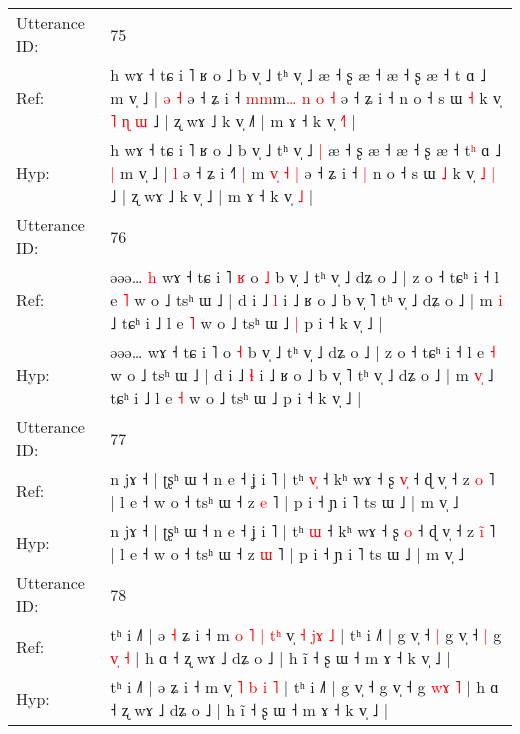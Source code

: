 \documentclass[10pt]{article}
\DeclareRobustCommand{\hl}[1]{{\textcolor{red}{#1}}}
\begin{document}
\begin{longtable}{ll}
 \\
\midrule
Utterance ID: & 75 \\
Ref: & h wɤ ˧ tɕ i ˥ ʁ o ˩ b v̩ ˩ tʰ v̩ ˩\hl{}\hl{} æ ˧ ʂ æ ˧ æ ˧ ʂ æ ˧ t\hl{} ɑ ˩\hl{}\hl{} m v̩ ˩ |\hl{ }\hl{ə} \hl{˧} ə ˧ ʑ i ˧\hl{} \hl{m}\hl{m}m\hl{…}\hl{ }\hl{n} \hl{o} \hl{˧} ə ˧ ʑ i ˧\hl{}\hl{} n o ˧ s ɯ \hl{˧} k v̩\hl{ }\hl{˥} \hl{ɳ} \hl{ɯ} ˩ | ʐ wɤ ˩ k v̩ ˩\hl{˥} | m ɤ ˧ k v̩ \hl{˧}\hl{˥} |
 \\
Hyp: & h wɤ ˧ tɕ i ˥ ʁ o ˩ b v̩ ˩ tʰ v̩ ˩\hl{ }\hl{|} æ ˧ ʂ æ ˧ æ ˧ ʂ æ ˧ t\hl{ʰ} ɑ ˩\hl{ }\hl{|} m v̩ ˩ |\hl{}\hl{} \hl{l} ə ˧ ʑ i ˧\hl{˥} \hl{|}\hl{ }m\hl{ }\hl{v}\hl{̩} \hl{˧} \hl{|} ə ˧ ʑ i ˧\hl{ }\hl{|} n o ˧ s ɯ \hl{˩} k v̩\hl{}\hl{} \hl{˩} \hl{|} ˩ | ʐ wɤ ˩ k v̩ ˩\hl{} | m ɤ ˧ k v̩ \hl{}\hl{˩} |
 \\
\midrule
Utterance ID: & 76 \\
Ref: & əəə…\hl{ }\hl{h} wɤ ˧ tɕ i ˥\hl{ }\hl{ʁ} o \hl{˩} b v̩ ˩ tʰ v̩ ˩ dʑ o ˩ | z o ˧ tɕʰ i ˧ l e \hl{˥} w o ˩ tsʰ ɯ ˩ | d i ˩ \hl{l} i ˩ ʁ o ˩ b v̩ ˥ tʰ v̩ ˩ dʑ o ˩ | m \hl{}\hl{i} ˩ tɕʰ i ˩ l e \hl{˥} w o ˩ tsʰ ɯ ˩\hl{ }\hl{|} p i ˧ k v̩ ˩ |
 \\
Hyp: & əəə…\hl{}\hl{} wɤ ˧ tɕ i ˥\hl{}\hl{} o \hl{˧} b v̩ ˩ tʰ v̩ ˩ dʑ o ˩ | z o ˧ tɕʰ i ˧ l e \hl{˧} w o ˩ tsʰ ɯ ˩ | d i ˩ \hl{ɬ} i ˩ ʁ o ˩ b v̩ ˥ tʰ v̩ ˩ dʑ o ˩ | m \hl{v}\hl{̩} ˩ tɕʰ i ˩ l e \hl{˧} w o ˩ tsʰ ɯ ˩\hl{}\hl{} p i ˧ k v̩ ˩ |
 \\
\midrule
Utterance ID: & 77 \\
Ref: & n jɤ ˧ | ʈʂʰ ɯ ˧ n e ˧ ʝ i ˥ | tʰ \hl{v}\hl{̩} ˧ kʰ wɤ ˧ ʂ \hl{v}\hl{̩} ˧ ɖ v̩ ˧ z \hl{}\hl{o} ˥ | l e ˧ w o ˧ tsʰ ɯ ˧ z \hl{e} ˥ | p i ˧ ɲ i ˥ ts ɯ ˩ | m v̩ ˩
 \\
Hyp: & n jɤ ˧ | ʈʂʰ ɯ ˧ n e ˧ ʝ i ˥ | tʰ \hl{}\hl{ɯ} ˧ kʰ wɤ ˧ ʂ \hl{}\hl{o} ˧ ɖ v̩ ˧ z \hl{i}\hl{̃} ˥ | l e ˧ w o ˧ tsʰ ɯ ˧ z \hl{ɯ} ˥ | p i ˧ ɲ i ˥ ts ɯ ˩ | m v̩ ˩
 \\
\midrule
Utterance ID: & 78 \\
Ref: & tʰ i ˩˥ | ə\hl{ }\hl{˧} ʑ i ˧ m\hl{ }\hl{o}\hl{ }\hl{˥}\hl{ }\hl{|}\hl{ }\hl{t}\hl{ʰ} v̩ \hl{˧} \hl{}\hl{j}\hl{ɤ} \hl{˩} | tʰ i ˩˥ | g v̩ ˧\hl{ }\hl{|} g v̩ ˧\hl{ }\hl{|} g \hl{v}\hl{̩} \hl{˧} | h ɑ ˧ ʐ wɤ ˩ dʑ o ˩ | h ĩ ˧ ʂ ɯ ˧ m ɤ ˧ k v̩ ˩ |
 \\
Hyp: & tʰ i ˩˥ | ə\hl{}\hl{} ʑ i ˧ m\hl{}\hl{}\hl{}\hl{}\hl{}\hl{}\hl{}\hl{}\hl{} v̩ \hl{˥} \hl{b}\hl{ }\hl{i} \hl{˥} | tʰ i ˩˥ | g v̩ ˧\hl{}\hl{} g v̩ ˧\hl{}\hl{} g \hl{w}\hl{ɤ} \hl{˥} | h ɑ ˧ ʐ wɤ ˩ dʑ o ˩ | h ĩ ˧ ʂ ɯ ˧ m ɤ ˧ k v̩ ˩ |
 \\
\midrule

\end{longtable}
\end{document}
